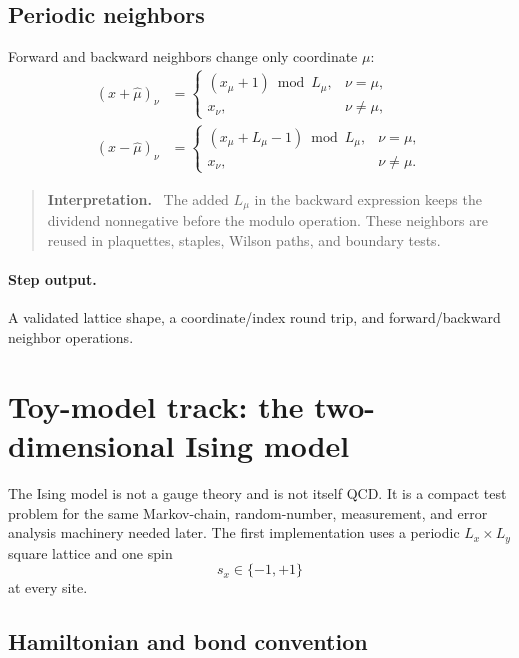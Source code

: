\documentclass[11pt]{article}
\newenvironment{interpretation}
  {\begin{quote}\small\noindent\textbf{Interpretation.}\ }
  {\end{quote}}
\begin{document}
\subsection{Periodic neighbors}

Forward and backward neighbors change only coordinate \(\mu\):
\begin{equation}
\begin{aligned}
  (x+\hat\mu)_\nu &=
  \begin{cases}
    (x_\mu+1)\bmod L_\mu, & \nu=\mu,\\
    x_\nu,                & \nu\neq\mu,
  \end{cases}
  \\[1ex]
  (x-\hat\mu)_\nu &=
  \begin{cases}
    (x_\mu+L_\mu-1)\bmod L_\mu, & \nu=\mu,\\
    x_\nu,                      & \nu\neq\mu.
  \end{cases}
  \label{eq:periodic-neighbors}
\end{aligned}
\end{equation}

\begin{interpretation}
The added \(L_\mu\) in the backward expression keeps the dividend nonnegative
before the modulo operation. These neighbors are reused in plaquettes, staples,
Wilson paths, and boundary tests.
\end{interpretation}

\paragraph{Step output.}
A validated lattice shape, a coordinate/index round trip, and forward/backward
neighbor operations.

\section{Toy-model track: the two-dimensional Ising model}

The Ising model is not a gauge theory and is not itself QCD.  It is a compact
test problem for the same Markov-chain, random-number, measurement, and error
analysis machinery needed later.  The first implementation uses a periodic
\(L_x\times L_y\) square lattice and one spin
\begin{equation}
  s_x\in\{-1,+1\}
  \label{eq:ising-spin}
\end{equation}
at every site.

\subsection{Hamiltonian and bond convention}
\end{document}
